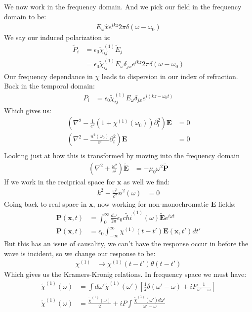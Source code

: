 We now work in the frequency domain.
And we pick our field in the frequency domain to be:
\begin{align*}
	E_\omega \hat{x} e^{ikz} 2\pi\delta(\omega-\omega_0)
\end{align*}
We say our induced polarization is:
\begin{align*}
	\tilde{P}_i &= \epsilon_0 \tilde{\chi}^{(1)}_{ij} \tilde{E}_j \\
	&= \epsilon_0 \tilde{\chi}^{(1)}_{ij} E_\omega \delta_{jx} e^{ikz} 2\pi\delta(\omega-\omega_0)
\end{align*}
Our frequency dependance in $\chi$ leads to dispersion in our index of refraction. Back in the temporal domain:
\begin{align*}
	P_i &= \epsilon_0 \tilde{\chi}^{(1)}_{ij} E_\omega \delta_{jx} e^{i(kz-\omega_0 t)}
\end{align*}
Which gives us:
\begin{align*}
	\left(\nabla^2 - \frac{1}{c^2}(1 + \chi^{(1)}(\omega_0))\partial_t^2\right)\bm{E} &= 0 \\
	\left(\nabla^2 - \frac{n^2(\omega_0)}{c^2}\partial_t^2\right)\bm{E} &= 0 \\
\end{align*}
Looking just at how this is transformed by moving into the frequency domain
\begin{align*}
	\left(\nabla^2 + \frac{\omega^2}{c^2}\right) \tilde{\bm{E}} &= -\mu_0\omega^2\tilde{\bm{P}}
\end{align*}
If we work in the reciprical space for $\bm{x}$ as well we find:
\begin{align*}
	k^2 - \frac{\omega^2}{c^2}n^2(\omega) &= 0
\end{align*}
Going back to real space in $\bm{x}$, now working for non-monochromatic $\bm{E}$ fields:
\begin{align*}
	\bm{P}(\bm{x},t) &= \int_0^\infty \frac{d\omega}{2\pi} \epsilon_0 \tilde{chi}^{(1)} (\omega) \tilde{\bm{E}} e^{i\omega t} \\
	\bm{P}(\bm{x},t) &= \epsilon_0\int_{-\infty}^\infty \chi^{(1)}(t-t') \bm{E}(\bm{x},t') dt'
\end{align*}
But this has an issue of causality, we can't have the response occur in before the wave is incident, so we change our response to be:
\begin{align*}
	\chi^{(1)} &\to \chi^{(1)}(t-t')\theta(t-t')
\end{align*}
Which gives us the Kramers-Kronig relations. In frequency space we must have:
\begin{align*}
	\tilde{\chi}^{(1)}(\omega) &= \int d\omega' \tilde{\chi}^{(1)}(\omega') \left[ \frac{1}{2}\delta(\omega'-\omega) + i P \frac{1}{\omega'-\omega}\right] \\
	\tilde{\chi}^{(1)}(\omega) &= \frac{\tilde{\chi}^{(1)}(\omega)}{2} + i P \int \frac{\tilde{\chi}^{(1)}(\omega')d\omega'}{\omega'-\omega}
\end{align*}
